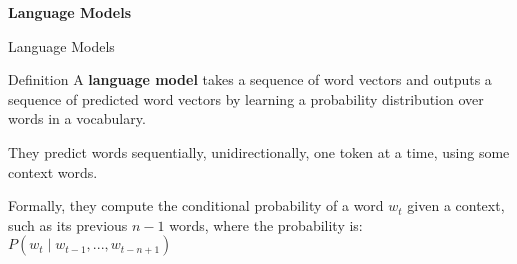 
\begin{frame}{}
    \centering\large\textbf{Language Models}
\end{frame}




\begin{frame}{Language Models}
      \small 
    
    \begin{definitionBlock}{Definition}
    A \alert{\textbf{language model}} takes a sequence of word vectors and outputs a sequence of predicted word vectors by learning a probability distribution over words in a vocabulary.
    
    They predict words sequentially, unidirectionally, one token at a time, using some context words. 
    
    
    \end{definitionBlock}
    
    Formally, they compute the conditional probability of a word $w_t$ given a context, such as its previous $n-1$ words, where the probability is: $P(w_t \; | \; w_{t-1}, ..., w_{t-n+1})$
    
\end{frame}





